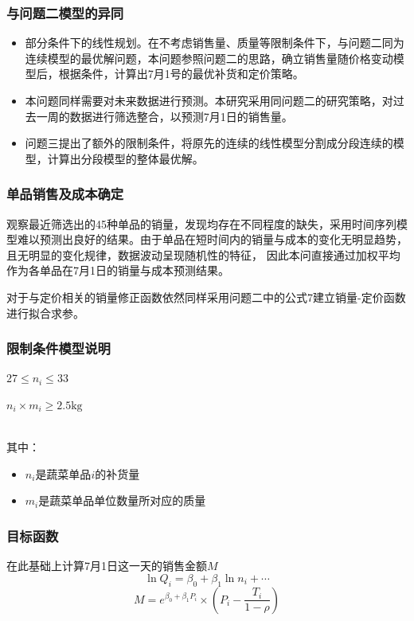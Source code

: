 \documentclass{article}
\begin{document}
\subsubsection{与问题二模型的异同}
\begin{itemize}
    \item 部分条件下的线性规划。在不考虑销售量、质量等限制条件下，与问题二同为连续模型的最优解问题，本问题参照问题二的思路，确立销售量随价格变动模型后，根据条件，计算出7月1号的最优补货和定价策略。
    \item 本问题同样需要对未来数据进行预测。本研究采用同问题二的研究策略，对过去一周的数据进行筛选整合，以预测7月1日的销售量。
    \item 问题三提出了额外的限制条件，将原先的连续的线性模型分割成分段连续的模型，计算出分段模型的整体最优解。
\end{itemize}

\subsubsection{单品销售及成本确定}
观察最近筛选出的45种单品的销量，发现均存在不同程度的缺失，采用时间序列模型难以预测出良好的结果。由于单品在短时间内的销量与成本的变化无明显趋势，且无明显的变化规律，数据波动呈现随机性的特征，
因此本问直接通过加权平均作为各单品在7月1日的销量与成本预测结果。

对于与定价相关的销量修正函数依然同样采用问题二中的公式7建立销量-定价函数进行拟合求参。

\subsubsection{限制条件模型说明}
$  27 \leq n_i \leq 33$

$ n_i \times m_i \geq 2.5 \text{kg}$

~\\
其中：
\begin{itemize}
    \item $n_i$是蔬菜单品$i$的补货量
    \item $m_i$是蔬菜单品单位数量所对应的质量
\end{itemize}

\subsubsection{目标函数}
在此基础上计算7月1日这一天的销售金额$M$
\[
\ln Q_i = \beta_0 + \beta_1 \ln n_i + \cdots
\]
\[M = e^{\beta_0 + \beta_1P_i} \times (P_i -\frac{T_i}{1-\rho} )\]
\end{document}
